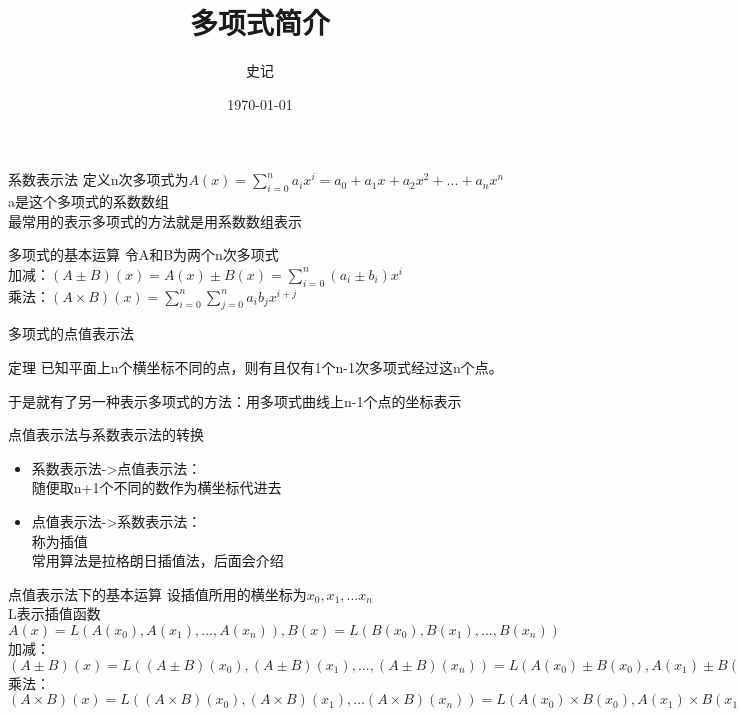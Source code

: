 \documentclass{beamer}
\begin{document}
\title{多项式简介}
\author{史记}
\date{\today}

\begin{frame}
\titlepage
\end{frame}

\begin{frame}{系数表示法}
定义n次多项式为$A(x)=\sum_{i=0}^{n}a_ix^i=a_0+a_1x+a_2x^2+...+a_nx^n$\\
a是这个多项式的系数数组\\
最常用的表示多项式的方法就是用系数数组表示\\
\end{frame}

\begin{frame}{多项式的基本运算}
令A和B为两个n次多项式\\
加减：$(A\pm B)(x)=A(x)\pm B(x)=\sum_{i=0}^{n}(a_{i}\pm b_{i})x^{i}$\\
乘法：$(A\times B)(x)=\sum_{i=0}^{n}\sum_{j=0}^{n}a_{i}b_{j}x^{i+j}$
\end{frame}

\begin{frame}{多项式的点值表示法}
\begin{block}{定理}
已知平面上n个横坐标不同的点，则有且仅有1个n-1次多项式经过这n个点。
\end{block}
\pause
于是就有了另一种表示多项式的方法：用多项式曲线上n-1个点的坐标表示
\end{frame}

\begin{frame}{点值表示法与系数表示法的转换}
\begin{itemize}
\item 系数表示法->点值表示法：\\
随便取n+1个不同的数作为横坐标代进去\\
\pause
\item 点值表示法->系数表示法：\\
称为插值\\
常用算法是拉格朗日插值法，后面会介绍\\
\end{itemize}
\end{frame}

\begin{frame}{点值表示法下的基本运算}
设插值所用的横坐标为$x_0,x_1,...x_n$\\
L表示插值函数\\
$A(x)=L(A(x_0),A(x_1),...,A(x_n)),B(x)=L(B(x_0),B(x_1),...,B(x_n))$\\
\pause
加减：$(A\pm B)(x)=L((A\pm B)(x_0),(A\pm B)(x_1),...,(A\pm B)(x_n))=L(A(x_0)\pm B(x_0),A(x_1)\pm B(x_1),...,A(x_n)\pm B(x_n))$\\
\pause
乘法：$(A\times B)(x)=L((A\times B)(x_0),(A\times B)(x_1),...(A\times B)(x_n))=L(A(x_0)\times B(x_0),A(x_1)\times B(x_1),...,A(x_n)\times B(x_n))$
\end{frame}
\end{document}

